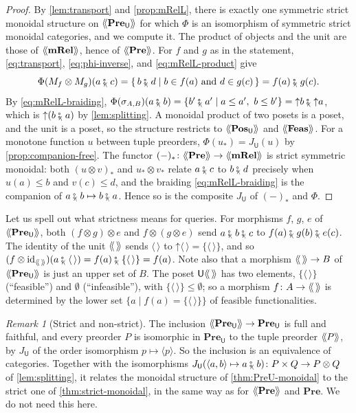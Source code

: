 \documentclass[11pt,a4paper]{article}
\theoremstyle{plain}
\theoremstyle{definition}
\theoremstyle{remark}
\newtheorem{remark}[theorem]{Remark}
\newcommand{\Cat}[1]{\mathbf{#1}}
\newcommand{\Pre}{\Cat{Pre}}
\newcommand{\Pos}{\Cat{Pos}}
\newcommand{\mRel}{\Cat{mRel}}
\newcommand{\Feas}{\Cat{Feas}}
\newcommand{\U}{\mathsf{U}}
\newcommand{\PreU}{\Pre_{\U}}
\newcommand{\PosU}{\Pos_{\U}}
\providecommand{\llangle}{\mathopen{\langle\mkern-3.5mu\langle}}
\providecommand{\rrangle}{\mathclose{\rangle\mkern-3.5mu\rangle}}
\newcommand{\tL}[1]{\llangle #1 \rrangle}
\newcommand{\tc}{\mathbin{\fatsemi_{\!\scriptscriptstyle\langle}}}
\newcommand{\tup}[1]{\langle #1 \rangle}
\newcommand{\etup}{\langle\,\rangle}
\newcommand{\up}{\mathord{\uparrow}}
\newcommand{\id}{\mathrm{id}}
\newcommand{\comp}[1]{#1_{*}}
\begin{document}
\begin{proof}
    By \cref{lem:transport} and \cref{prop:mRelL}, there is exactly one symmetric strict monoidal structure on $\tL{\PreU}$ for which $\Phi$ is an isomorphism of symmetric strict monoidal categories, and we compute it.
    The product of objects and the unit are those of $\tL{\mRel}$, hence of $\tL{\Pre}$.
    For $f$ and $g$ as in the statement, \cref{eq:transport}, \cref{eq:phi-inverse}, and \cref{eq:mRelL-product} give
    \begin{equation*}
        \Phi(M_f \otimes M_g)(a \tc c) = \{\, b \tc d \mid b \in f(a) \text{ and } d \in g(c) \,\} = f(a) \tc g(c).
    \end{equation*}
    By \cref{eq:mRelL-braiding}, $\Phi(\sigma_{A,B})(a \tc b) = \{ b' \tc a' \mid a \leq a',\ b \leq b' \} = \up b \tc \up a$, which is $\up(b \tc a)$ by \cref{lem:splitting}.
    A monoidal product of two posets is a poset, and the unit is a poset, so the structure restricts to $\tL{\PosU}$ and $\tL{\Feas}$.
    For a monotone function $u$ between tuple preorders, $\Phi(\comp{u}) = J_{\U}(u)$ by \cref{prop:companion-free}.
    The functor $\comp{(-)} \colon \tL{\Pre} \to \tL{\mRel}$ is strict symmetric monoidal: both $\comp{(u \otimes v)}$ and $\comp{u} \otimes \comp{v}$ relate $a \tc c$ to $b \tc d$ precisely when $u(a) \leq b$ and $v(c) \leq d$, and the braiding \cref{eq:mRelL-braiding} is the companion of $a \tc b \mapsto b \tc a$.
    Hence so is the composite $J_{\U}$ of $\comp{(-)}$ and $\Phi$.
\end{proof}

Let us spell out what strictness means for queries.
For morphisms $f$, $g$, $e$ of $\tL{\PreU}$, both $(f \otimes g) \otimes e$ and $f \otimes (g \otimes e)$ send $a \tc b \tc c$ to $f(a) \tc g(b) \tc e(c)$.
The identity of the unit $\tL{\,}$ sends $\etup$ to $\up \etup = \{\etup\}$, and so $(f \otimes \id_{\tL{\,}})(a \tc \etup) = f(a) \tc \{\etup\} = f(a)$.
Note also that a morphism $\tL{\,} \to B$ of $\tL{\PreU}$ is just an upper set of $B$.
The poset $\U\tL{\,}$ has two elements, $\{\etup\}$ (``feasible'') and $\emptyset$ (``infeasible''), with $\{\etup\} \leq \emptyset$; so a morphism $f \colon A \to \tL{\,}$ is determined by the lower set $\{ a \mid f(a) = \{\etup\} \}$ of feasible functionalities.

\begin{remark}[Strict and non-strict]
    The inclusion $\tL{\PreU} \to \PreU$ is full and faithful, and every preorder $P$ is isomorphic in $\PreU$ to the tuple preorder $\tL{P}$, by $J_{\U}$ of the order isomorphism $p \mapsto \tup{p}$.
    So the inclusion is an equivalence of categories.
    Together with the isomorphisms $J_{\U}(\tup{a,b} \mapsto a \tc b) \colon P \times Q \to P \otimes Q$ of \cref{lem:splitting}, it relates the monoidal structure of \cref{thm:PreU-monoidal} to the strict one of \cref{thm:strict-monoidal}, in the same way as for $\tL{\Pre}$ and $\Pre$.
    We do not need this here.
\end{remark}
\end{document}
